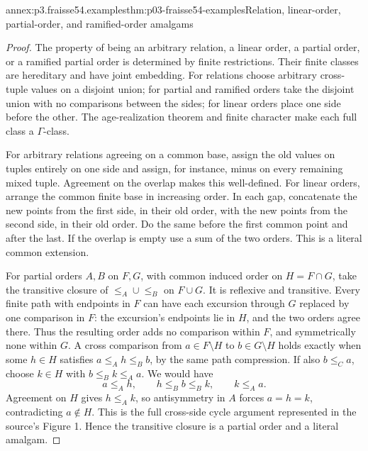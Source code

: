 \begin{annexitem}{annex:p3.fraisse54.examples}{thm:p03-fraisse54-examples}{Relation, linear-order, partial-order, and ramified-order amalgams}
\begin{proof}
The property of being an arbitrary relation, a linear order, a partial
order, or a ramified partial order is determined by finite restrictions.
Their finite classes are hereditary and have joint embedding. For
relations choose arbitrary cross-tuple values on a disjoint union; for
partial and ramified orders take the disjoint union with no comparisons
between the sides; for linear orders place one side before the other.
The age-realization theorem and finite character make each full class
a \(\Gamma\)-class.

For arbitrary relations agreeing on a common base, assign the old values
on tuples entirely on one side and assign, for instance, minus on every
remaining mixed tuple. Agreement on the overlap makes this well-defined.
For linear orders, arrange the common finite base in increasing order.
In each gap, concatenate the new points from the first side, in their old
order, with the new points from the second side, in their old order.
Do the same before the first common point and after the last. If the
overlap is empty use a sum of the two orders. This is a literal common
extension.

For partial orders \(A,B\) on \(F,G\), with common induced order on
\(H=F\cap G\), take the transitive closure of
\(\leq_A\cup\leq_B\) on \(F\cup G\). It is reflexive and transitive.
Every finite path with endpoints in \(F\) can have each excursion through
\(G\) replaced by one comparison in \(F\): the excursion's endpoints
lie in \(H\), and the two orders agree there. Thus the resulting order
adds no comparison within \(F\), and symmetrically none within \(G\).
A cross comparison from \(a\in F\setminus H\) to
\(b\in G\setminus H\) holds exactly when some \(h\in H\) satisfies
\(a\leq_Ah\leq_Bb\), by the same path compression.
If also \(b\leq_Ca\), choose \(k\in H\) with
\(b\leq_Bk\leq_Aa\). We would have
\[
 a\leq_Ah,\qquad h\leq_Bb\leq_Bk,\qquad k\leq_Aa.
\]
Agreement on \(H\) gives \(h\leq_Ak\), so antisymmetry in \(A\)
forces \(a=h=k\), contradicting \(a\notin H\). This is the full
cross-side cycle argument represented in the source's Figure 1.
Hence the transitive closure is a partial order and a literal amalgam.


\end{proof}
\end{annexitem}
